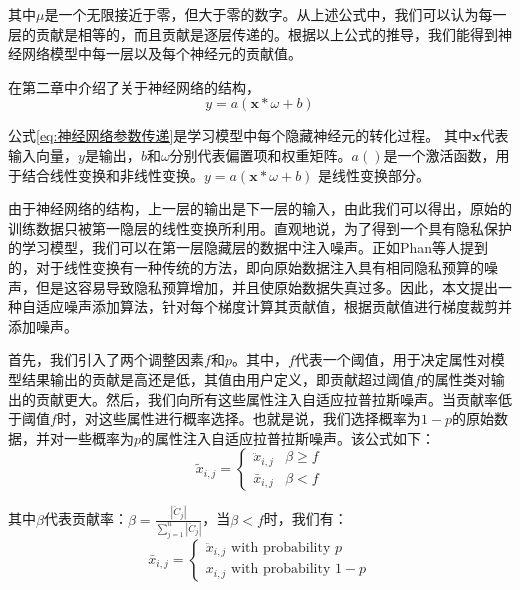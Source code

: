 其中$\mu$是一个无限接近于零，但大于零的数字。从上述公式中，我们可以认为每一层的贡献是相等的，而且贡献是逐层传递的。根据以上公式的推导，我们能得到神经网络模型中每一层以及每个神经元的贡献值。

在第二章中介绍了关于神经网络的结构，
\begin{equation}\label{eq:神经网络参数传递}
y=a(\mathbf{x} * \omega+b)
\end{equation}

公式\ref{eq:神经网络参数传递}是学习模型中每个隐藏神经元的转化过程。
其中$\mathbf{x}$代表输入向量，$y$是输出，$b$和$\omega$分别代表偏置项和权重矩阵。$a()$是一个激活函数，用于结合线性变换和非线性变换。$y=a(\mathbf{x} * \omega+b)$ 是线性变换部分。

由于神经网络的结构，上一层的输出是下一层的输入，由此我们可以得出，原始的训练数据只被第一隐层的线性变换所利用。直观地说，为了得到一个具有隐私保护的学习模型，我们可以在第一层隐藏层的数据中注入噪声。正如Phan等人提到的，对于线性变换有一种传统的方法，即向原始数据注入具有相同隐私预算的噪声，但是这容易导致隐私预算增加，并且使原始数据失真过多。因此，本文提出一种自适应噪声添加算法，针对每个梯度计算其贡献值，根据贡献值进行梯度裁剪并添加噪声。

首先，我们引入了两个调整因素$f$和$p$。其中，$f$代表一个阈值，用于决定属性对模型结果输出的贡献是高还是低，其值由用户定义，即贡献超过阈值$f$的属性类对输出的贡献更大。然后，我们向所有这些属性注入自适应拉普拉斯噪声。当贡献率低于阈值$f$时，对这些属性进行概率选择。也就是说，我们选择概率为$1-p$的原始数据，并对一些概率为$p$的属性注入自适应拉普拉斯噪声。该公式如下：
\begin{equation}\label{eq:神经网络加噪}
\tilde{x}_{i, j}=\left\{\begin{array}{ll}
\ddot{x}_{i, j} & \beta \geq f \\
\bar{x}_{i, j} & \beta<f
\end{array}\right.
\end{equation}

其中$\beta$代表贡献率：$\beta=\frac{\left|\ddot{C}_{j}\right|}{\sum_{j=1}^{u}\left|\ddot{C}_{j}\right|}$，当$\beta<f$时，我们有：
\begin{equation}\label{eq:神经网络加噪2}
\bar{x}_{i, j}=\left\{\begin{array}{l}
\ddot{x}_{i, j} \text { with probability } p \\
x_{i, j} \text { with probability } 1-p
\end{array}\right.
\end{equation}


